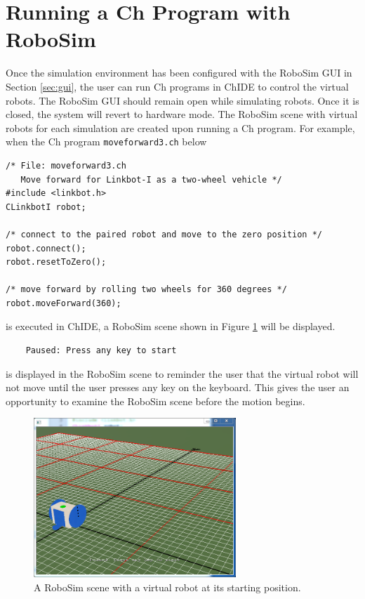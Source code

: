 \documentclass{article}
\begin{document}
\section{Running a Ch Program with RoboSim}
Once the simulation environment has been configured with the RoboSim GUI in
Section \ref{sec:gui}, the user can run Ch programs in ChIDE to control the
virtual robots.  The RoboSim GUI should remain open while simulating robots.
Once it is closed, the system will revert to hardware mode.  The RoboSim scene
with virtual robots for each simulation are created upon running a Ch program.
For example, when the Ch program {\tt moveforward3.ch} below
\begin{verbatim}
/* File: moveforward3.ch
   Move forward for Linkbot-I as a two-wheel vehicle */
#include <linkbot.h>
CLinkbotI robot;

/* connect to the paired robot and move to the zero position */
robot.connect();
robot.resetToZero();

/* move forward by rolling two wheels for 360 degrees */
robot.moveForward(360);
\end{verbatim}
\noindent
is executed in ChIDE, a RoboSim scene shown in Figure \ref{fig:robosim_scene}
will be displayed.
\begin{verbatim}
    Paused: Press any key to start
\end{verbatim}
is displayed in the RoboSim scene to reminder the user that the virtual robot
will not move until the user presses any key on the keyboard. This gives the
user an opportunity to examine the RoboSim scene before the motion begins.
\begin{figure}[H]
	\begin{center}
		\includegraphics[width=3in]{images/robosim_scene}
	\end{center}
	\caption{A RoboSim scene with a virtual robot at its starting position.}
	\label{fig:robosim_scene}
\end{figure}
\end{document}
